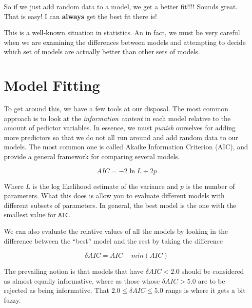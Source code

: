 \documentclass[
  letterpaper,
]{book}
\begin{document}
So if we just add random data to a model, we get a better fit!!!! Sounds
great. That is easy! I can \textbf{always} get the best fit there is!

This is a well-known situation in statistics. An in fact, we must be
very careful when we are examining the differences between models and
attempting to decide which set of models are actually better than other
sets of models.

\section{Model Fitting}\label{model-fitting}

To get around this, we have a few tools at our disposal. The most common
approach is to look at the \emph{information content} in each model
relative to the amount of pedictor variables. In essence, we must
\emph{punish} ourselves for adding more predictors so that we do not all
run around and add random data to our models. The most common one is
called Akaike Information Criterion (AIC), and provide a general
framework for comparing several models.

\[
AIC = -2 \ln L + 2p
\]

Where \(L\) is the log likelihood estimate of the variance and \(p\) is
the number of parameters. What this does is allow you to evaluate
different models with different subsets of parameters. In general, the
best model is the one with the smallest value for \texttt{AIC}.

We can also evaluate the relative values of all the models by looking in
the difference between the ``best'' model and the rest by taking the
difference

\[
\delta AIC = AIC - min(AIC)
\]

The prevailing notion is that models that have \(\delta AIC < 2.0\)
should be considered as almost equally informative, where as those whose
\(\delta AIC > 5.0\) are to be rejected as being informative. That
\(2.0 \le \delta AIC \le 5.0\) range is where it gets a bit fuzzy.
\end{document}
